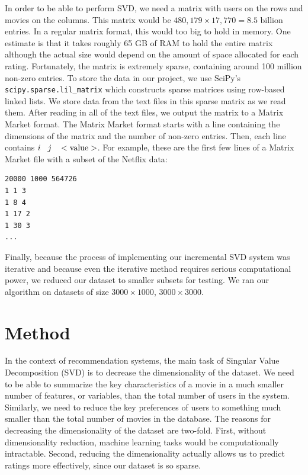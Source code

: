 \documentclass{article} %
\begin{document}
In order to be able to perform SVD, we need a matrix with users on the rows and movies on the columns.
This matrix would be $480,179 \times 17,770 = 8.5 \textrm{ billion}$ entries.
In a regular matrix format, this would too big to hold in memory. One estimate is that it takes roughly 65 GB of RAM to hold the entire matrix \citep{revoR} although the actual size would depend on the amount of space allocated for each rating.
Fortunately, the matrix is extremely sparse, containing around 100 million non-zero entries.
To store the data in our project, we use SciPy's \verb!scipy.sparse.lil_matrix! which constructs sparse matrices using row-based linked lists.
We store data from the text files in this sparse matrix as we read them.
After reading in all of the text files, we output the matrix to a Matrix Market format.
The Matrix Market format starts with a line containing the dimensions of the matrix and the number of non-zero entries.
Then, each line contains $i \hspace{2ex} j \hspace{2ex} <\textrm{value}>$.
For example, these are the first few lines of a Matrix Market file with a subset of the Netflix data:

\begin{verbatim}
20000 1000 564726
1 1 3
1 8 4
1 17 2
1 30 3
...
\end{verbatim}

Finally, because the process of implementing our incremental SVD system was iterative and because even the iterative method requires serious computational power, we reduced our dataset to smaller subsets for testing.
We ran our algorithm on datasets of size $3000 \times 1000$, $3000 \times 3000$.

\section{Method}

In the context of recommendation systems, the main task of Singular Value Decomposition (SVD) is to decrease the dimensionality of the dataset.
We need to be able to summarize the key characteristics of a movie in a much smaller number of features, or variables, than the total number of users in the system.
Similarly, we need to reduce the key preferences of users to something much smaller than the total number of movies in the database.
The reasons for decreasing the dimensionality of the dataset are two-fold.
First, without dimensionality reduction, machine learning tasks would be computationally intractable.
Second, reducing the dimensionality actually allows us to predict ratings more effectively, since our dataset is so sparse.
\end{document}
